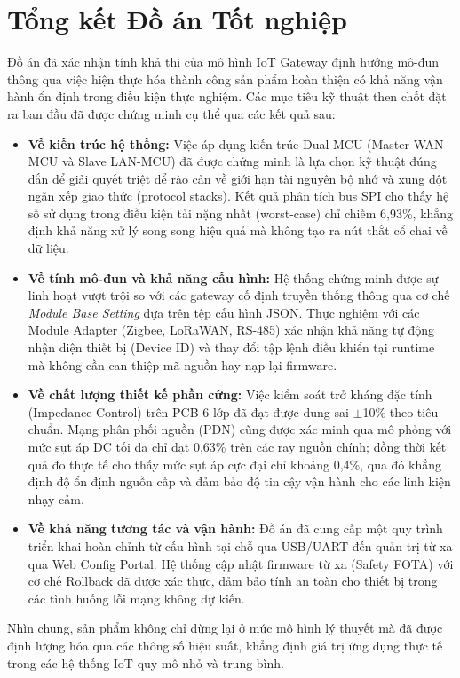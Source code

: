 \section{Tổng kết Đồ án Tốt nghiệp}
Đồ án đã xác nhận tính khả thi của mô hình IoT Gateway định hướng mô-đun thông qua việc hiện thực hóa thành công sản phẩm hoàn thiện có khả năng vận hành ổn định trong điều kiện thực nghiệm. Các mục tiêu kỹ thuật then chốt đặt ra ban đầu đã được chứng minh cụ thể qua các kết quả sau:

\begin{itemize}
    \item \textbf{Về kiến trúc hệ thống:} Việc áp dụng kiến trúc Dual-MCU (Master WAN-MCU và Slave LAN-MCU) đã được chứng minh là lựa chọn kỹ thuật đúng đắn để giải quyết triệt để rào cản về giới hạn tài nguyên bộ nhớ và xung đột ngăn xếp giao thức (protocol stacks). Kết quả phân tích bus SPI cho thấy hệ số sử dụng trong điều kiện tải nặng nhất (worst-case) chỉ chiếm 6,93\%, khẳng định khả năng xử lý song song hiệu quả mà không tạo ra nút thắt cổ chai về dữ liệu.
    
    \item \textbf{Về tính mô-đun và khả năng cấu hình:} Hệ thống chứng minh được sự linh hoạt vượt trội so với các gateway cố định truyền thống thông qua cơ chế \textit{Module Base Setting} dựa trên tệp cấu hình JSON. Thực nghiệm với các Module Adapter (Zigbee, LoRaWAN, RS-485) xác nhận khả năng tự động nhận diện thiết bị (Device ID) và thay đổi tập lệnh điều khiển tại runtime mà không cần can thiệp mã nguồn hay nạp lại firmware.
    
    \item \textbf{Về chất lượng thiết kế phần cứng:} Việc kiểm soát trở kháng đặc tính (Impedance Control) trên PCB 6 lớp đã đạt được dung sai $\pm$10\% theo tiêu chuẩn. Mạng phân phối nguồn (PDN) cũng được xác minh qua mô phỏng với mức sụt áp DC tối đa chỉ đạt 0,63\% trên các ray nguồn chính; đồng thời kết quả đo thực tế cho thấy mức sụt áp cực đại chỉ khoảng 0,4\%, qua đó khẳng định độ ổn định nguồn cấp và đảm bảo độ tin cậy vận hành cho các linh kiện nhạy cảm.
    
    \item \textbf{Về khả năng tương tác và vận hành:} Đồ án đã cung cấp một quy trình triển khai hoàn chỉnh từ cấu hình tại chỗ qua USB/UART đến quản trị từ xa qua Web Config Portal. Hệ thống cập nhật firmware từ xa (Safety FOTA) với cơ chế Rollback đã được xác thực, đảm bảo tính an toàn cho thiết bị trong các tình huống lỗi mạng không dự kiến.
\end{itemize}

Nhìn chung, sản phẩm không chỉ dừng lại ở mức mô hình lý thuyết mà đã được định lượng hóa qua các thông số hiệu suất, khẳng định giá trị ứng dụng thực tế trong các hệ thống IoT quy mô nhỏ và trung bình.